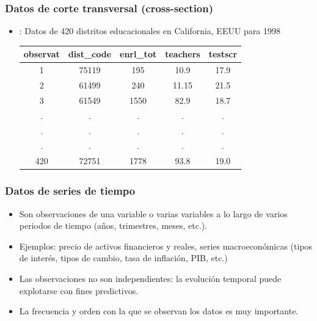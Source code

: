 \documentclass[t, compress, spanish, aspectratio=169]{beamer}
\newcommand{\term}[1]{\structure{\textbf{#1}}} %
\begin{document}
    \begin{frame}
        \frametitle{Datos de corte transversal (cross-section)}
        \begin{itemize}
            \item \term{Ejemplo}: Datos de 420 distritos educacionales en California, EEUU para 1998
            
            \begin{table}
                \centering
                \begin{tabular}{ccccc}
                    \hline
                    observat & dist\_code & enrl\_tot & teachers & testscr \\
                    \hline
                    1 & 75119 &  195 & 10.9  & 17.9 \\
                    2 & 61499 &  240 & 11.15 & 21.5 \\
                    3 & 61549 & 1550 & 82.9  & 18.7 \\
                    . &     . &    . &     . &    . \\
                    . &     . &    . &     . &    . \\
                    . &     . &    . &     . &    . \\
                    420 & 72751 & 1778 & 93.8  & 19.0 \\
                    \hline
                \end{tabular}
            \end{table}
        \end{itemize}
    \end{frame}
    
    \begin{frame}
        \frametitle{Datos de series de tiempo}
        \begin{itemize}
            \item Son observaciones de una variable o varias variables a lo largo de
            varios periodos de tiempo (a\~nos, trimestres, meses, etc.). 
            
            \item Ejemplos: precio de
            activos financieros y reales, series macroecon\'omicas (tipos de inter\'es, tipos de cambio, tasa de inflaci\'on, PIB, etc.)
            
            \item Las observaciones no son independientes: la evoluci\'on temporal
            puede explotarse con fines predictivos.
            
            \item La frecuencia y orden con la que se observan los datos es muy
            importante.
        \end{itemize}
    \end{frame}
    
\end{document}
